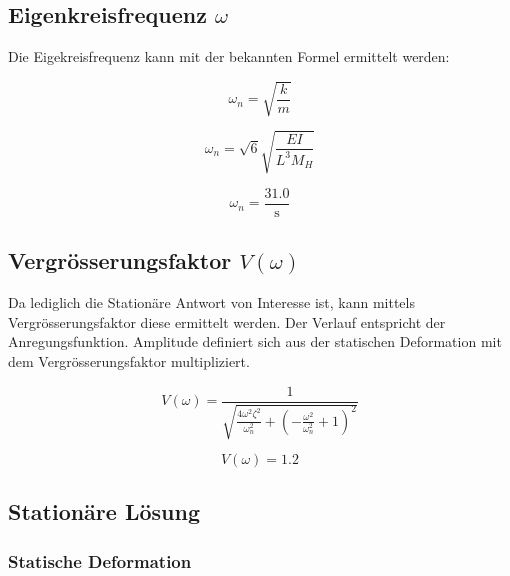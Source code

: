 \documentclass[
  letterpaper,
  DIV=11]{scrreprt}
\begin{document}
\hypertarget{eigenkreisfrequenz-omega}{%
\subsection{\texorpdfstring{Eigenkreisfrequenz
\(\omega\)}{Eigenkreisfrequenz \textbackslash omega}}\label{eigenkreisfrequenz-omega}}

Die Eigekreisfrequenz kann mit der bekannten Formel ermittelt werden:

\begin{equation}\omega_{n} = \sqrt{\frac{k}{m}}\end{equation}

\begin{equation}\omega_{n} = \sqrt{6} \sqrt{\frac{E I}{L^{3} M_{H}}}\end{equation}

\begin{equation}\omega_{n} = \frac{31.0}{\text{s}}\end{equation}

\hypertarget{vergruxf6sserungsfaktor-vomega}{%
\subsection{\texorpdfstring{Vergrösserungsfaktor
\(V(\omega)\)}{Vergrösserungsfaktor V(\textbackslash omega)}}\label{vergruxf6sserungsfaktor-vomega}}

Da lediglich die Stationäre Antwort von Interesse ist, kann mittels
Vergrösserungsfaktor diese ermittelt werden. Der Verlauf entspricht der
Anregungsfunktion. Amplitude definiert sich aus der statischen
Deformation mit dem Vergrösserungsfaktor multipliziert.

\begin{equation}V{\left(\omega \right)} = \frac{1}{\sqrt{\frac{4 \omega^{2} \zeta_{}^{2}}{\omega_{n}^{2}} + \left(- \frac{\omega^{2}}{\omega_{n}^{2}} + 1\right)^{2}}}\end{equation}

\begin{equation}V{\left(\omega \right)} = 1.2\end{equation}

\hypertarget{stationuxe4re-luxf6sung}{%
\subsection{Stationäre Lösung}\label{stationuxe4re-luxf6sung}}

\hypertarget{statische-deformation-2}{%
\subsubsection{Statische Deformation}\label{statische-deformation-2}}
\end{document}
